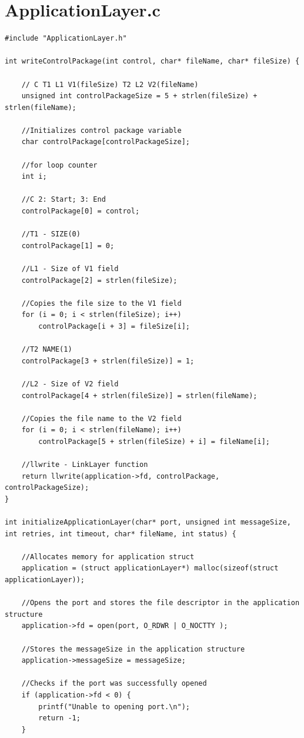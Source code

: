 \documentclass[a4paper]{article}
\begin{document}
\section{ApplicationLayer.c}
\begin{lstlisting}
#include "ApplicationLayer.h"

int writeControlPackage(int control, char* fileName, char* fileSize) {

    // C T1 L1 V1(fileSize) T2 L2 V2(fileName) 
    unsigned int controlPackageSize = 5 + strlen(fileSize) + strlen(fileName);

	//Initializes control package variable
    char controlPackage[controlPackageSize];

	//for loop counter
    int i;
    
    //C 2: Start; 3: End
    controlPackage[0] = control;
    
    //T1 - SIZE(0)
    controlPackage[1] = 0; 

    //L1 - Size of V1 field
    controlPackage[2] = strlen(fileSize);

    //Copies the file size to the V1 field
    for (i = 0; i < strlen(fileSize); i++)
        controlPackage[i + 3] = fileSize[i];

    //T2 NAME(1)
    controlPackage[3 + strlen(fileSize)] = 1;
    
    //L2 - Size of V2 field
    controlPackage[4 + strlen(fileSize)] = strlen(fileName);

    //Copies the file name to the V2 field
    for (i = 0; i < strlen(fileName); i++)
        controlPackage[5 + strlen(fileSize) + i] = fileName[i];

    //llwrite - LinkLayer function 
    return llwrite(application->fd, controlPackage, controlPackageSize);
}

int initializeApplicationLayer(char* port, unsigned int messageSize, int retries, int timeout, char* fileName, int status) {

	//Allocates memory for application struct
	application = (struct applicationLayer*) malloc(sizeof(struct applicationLayer));

	//Opens the port and stores the file descriptor in the application structure
	application->fd = open(port, O_RDWR | O_NOCTTY );

	//Stores the messageSize in the application structure
	application->messageSize = messageSize;

	//Checks if the port was successfully opened
	if (application->fd < 0) {
		printf("Unable to opening port.\n");
		return -1;
	}


\end{lstlisting}
\end{document}
